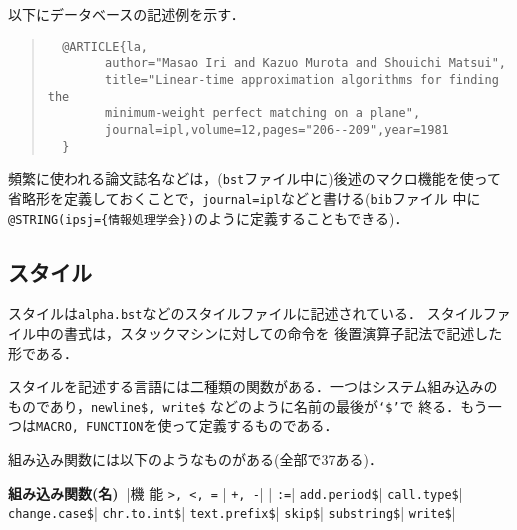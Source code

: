 以下にデータベースの記述例を示す．

{\baselineskip=11pt
\begin{quote}
\begin{verbatim}
  @ARTICLE{la,
        author="Masao Iri and Kazuo Murota and Shouichi Matsui",
        title="Linear-time approximation algorithms for finding the
        minimum-weight perfect matching on a plane",
        journal=ipl,volume=12,pages="206--209",year=1981
  }
\end{verbatim}
\end{quote}
}

頻繁に使われる論文誌名などは，({\tt bst}ファイル中に)後述のマクロ機能を使って
省略形を定義しておくことで，{\tt journal=ipl}などと書ける({\tt bib}ファイル
中に{\tt @STRING(ipsj=\{情報処理学会\})}のように定義することもできる)．

\subsection{スタイル}
スタイルは{\tt alpha.bst}などのスタイルファイルに記述されている．
スタイルファイル中の書式は，スタックマシンに対しての命令を
後置演算子記法で記述した形である\cite{btxhak}．

スタイルを記述する言語には二種類の関数がある．一つはシステム組み込みの
ものであり，{\tt newline\$, write\$} などのように名前の最後が{\tt `\$'}で
終る．もう一つは{\tt MACRO, FUNCTION}を使って定義するものである．

組み込み関数には以下のようなものがある(全部で37ある)．

\begin{table}[h]
\parasize=9.68cm
\begintable
{\dg\bf 組み込み関数(名)\ }|{\dg 機\hskip2cm 能}\hfil\crthick
{\tt >, <, =} \hfill | \cr
{\tt +, -}\hfill |\cr
{\tt *}\hfill | \cr
{\tt :=}\hfill |\crthick
{\tt add.period\$}\hfill|\cr
{\tt call.type\$}\hfill|\cr
{\tt change.case\$}\hfill | \cr
{\tt chr.to.int\$}\hfill |\cr 
{\tt text.prefix\$}\hfill | \cr
{\tt skip\$}\hfill | \cr
{\tt substring\$}\hfill | \cr
{\tt write\$}\hfill |  \endtable
\end{table}

